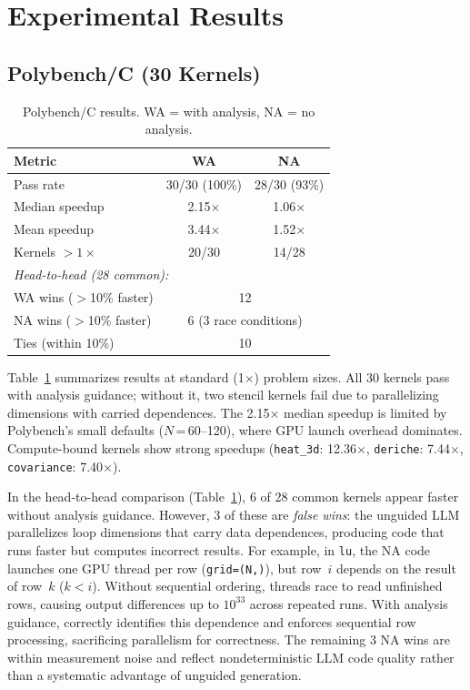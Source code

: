 \section{Experimental Results}
\label{sec:eval}


\subsection{Polybench/C (30 Kernels)}

\begin{table}[t]
  \caption{Polybench/C results.  WA = with analysis, NA = no analysis.}
  \label{tab:results_1x}
  \centering\small
  \begin{tabular}{lcc}
    \toprule
    \textbf{Metric} & \textbf{WA} & \textbf{NA} \\
    \midrule
    Pass rate              & 30/30 (100\%) & 28/30 (93\%) \\
    Median speedup         & 2.15$\times$  & 1.06$\times$ \\
    Mean speedup           & 3.44$\times$  & 1.52$\times$ \\
    Kernels $>1\times$     & 20/30         & 14/28         \\
    \midrule
    \multicolumn{3}{l}{\emph{Head-to-head (28 common):}} \\
    WA wins ($>$10\% faster) & \multicolumn{2}{c}{12} \\
    NA wins ($>$10\% faster) & \multicolumn{2}{c}{6 (3 race conditions)}  \\
    Ties (within 10\%)       & \multicolumn{2}{c}{10}  \\
    \bottomrule
  \end{tabular}
\end{table}

Table~\ref{tab:results_1x} summarizes results at standard
(1$\times$) problem sizes.  All 30 kernels pass with analysis
guidance; without it, two stencil kernels fail due to
parallelizing dimensions with carried dependences.
The 2.15$\times$ median speedup is limited by Polybench's
small defaults ($N$\,=\,60--120), where GPU launch overhead
dominates.  Compute-bound kernels show strong speedups
(\texttt{heat\_3d}: 12.36$\times$, \texttt{deriche}:
7.44$\times$, \texttt{covariance}: 7.40$\times$).

In the head-to-head comparison (Table~\ref{tab:results_1x}), 6 of 28 common kernels appear faster without analysis guidance. However, 3 of these are \emph{false wins}: the unguided LLM parallelizes loop dimensions that carry data dependences, producing code that runs faster but computes incorrect results. For example, in \texttt{lu}, the NA code launches one GPU thread per row (\texttt{grid=(N,)}), but row~$i$ depends on the result of row~$k$ ($k<i$). Without sequential ordering, threads race to read unfinished rows, causing output differences up to $10^{33}$ across repeated runs. With analysis guidance, \sysname correctly identifies this dependence and enforces sequential row processing, sacrificing parallelism for correctness. The remaining 3 NA wins are within measurement noise and reflect nondeterministic LLM code quality rather than a systematic advantage of unguided generation.

